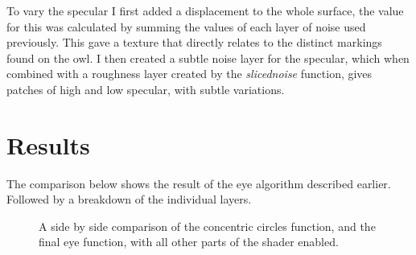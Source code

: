 \documentclass[]{acmsiggraph}
\begin{document}
To vary the specular I first added a displacement to the whole surface, the value for this was calculated by summing the values of each layer of noise used previously. This gave a texture that directly relates to the distinct markings found on the owl. I then created a subtle noise layer for the specular, which when combined with a roughness layer created by the \textit{slicednoise} function, gives patches of high and low specular, with subtle variations. 

\section{Results} \label{sec:results}
The comparison below shows the result of the eye algorithm described earlier. Followed by a breakdown of the individual layers.

\begin{figure}[htbp]
  \centering
 \hfill
 \caption{\label{fig:eyecomp}A side by side comparison of the concentric circles function, and the final eye function, with all other parts of the shader enabled.}
\end{figure}
\end{document}
